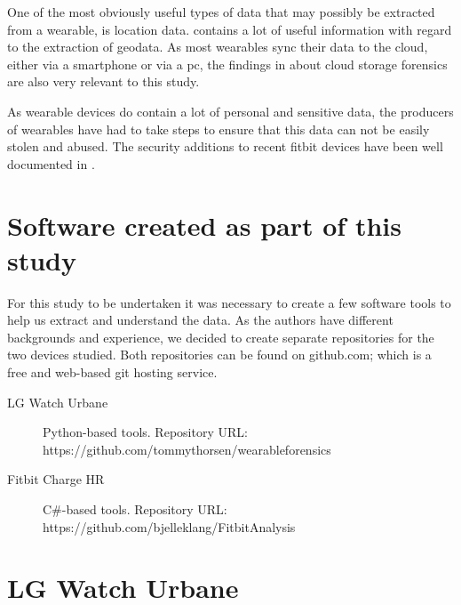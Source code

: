 \documentclass[a4paper,11pt,dvips]{article}
\begin{document}
One of the most obviously useful types of data that may possibly be extracted from a wearable, is location data. \cite{maus2011forensic} contains a lot of useful information with regard to the extraction of geodata. As most wearables sync their data to the cloud, either via a smartphone or via a pc, the findings in \cite{chung2012digital} about cloud storage forensics are also very relevant to this study.

As wearable devices do contain a lot of personal and sensitive data, the producers of wearables have had to take steps to ensure that this data can not be easily stolen and abused. The security additions to recent fitbit devices have been well documented in \cite{cyr2014security}.


\section{Software created as part of this study}
For this study to be undertaken it was necessary to create a few software tools to help us extract and understand the data. As the authors have different backgrounds and experience, we decided to create separate repositories for the two devices studied. Both repositories can be found on github.com; which is a free and web-based git hosting service.

\begin{description}
\item [LG Watch Urbane] Python-based tools. Repository URL:
\newline
https://github.com/tommythorsen/wearableforensics
\item [Fitbit Charge HR] C\#-based tools. Repository URL:
\newline
https://github.com/bjelleklang/FitbitAnalysis	
\end{description}


\section{LG Watch Urbane}
\end{document}
